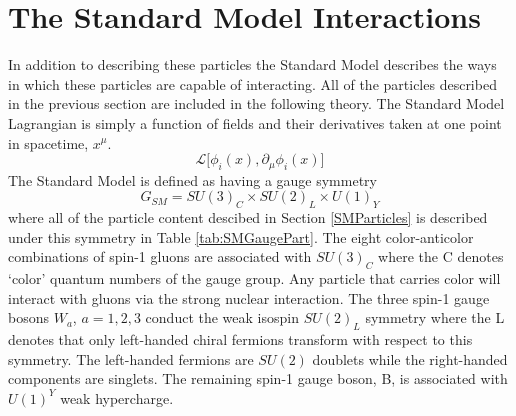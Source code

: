 \section{The Standard Model Interactions}
In addition to describing these particles the Standard Model describes the ways in which these particles are capable of interacting.  All of the particles described in the previous section are included in the following theory.  The Standard Model Lagrangian is simply a function of fields and their derivatives taken at one point in spacetime, $x^{\mu}$.  
 \[ \mathcal{L} \lbrack \phi_{i}(x),\partial_{\mu}\phi_{i}(x) \rbrack \] 
The Standard Model is defined as having a gauge symmetry
\[ G_{SM} =SU(3)_C \times SU(2)_L \times U(1)_Y \]
where all of the particle content descibed in Section \ref{SMParticles} is described under this symmetry in Table \ref{tab:SMGaugePart}\cite{GrossmanLecture}.  The eight color-anticolor combinations of spin-1 gluons are associated with $SU(3)_C$ where the C denotes `color' quantum numbers of the gauge group.  Any particle that carries color will interact with gluons via the strong nuclear interaction.  The three spin-1 gauge bosons $W_a$, $a=1,2,3$ conduct the weak isospin $SU(2)_L$ symmetry where the L denotes that only left-handed chiral fermions transform with respect to this symmetry.  The left-handed fermions are $SU(2)$ doublets while the right-handed components are singlets.  The remaining spin-1 gauge boson, B, is associated with $U(1)^Y$ weak hypercharge.  

